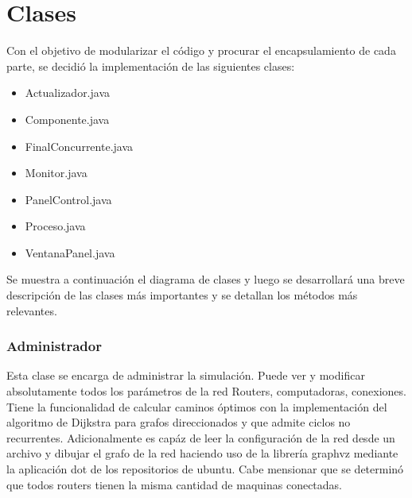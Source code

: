 \documentclass[12pt]{article} %
\begin{document}
\section{Clases}
Con el objetivo de modularizar el código y procurar el encapsulamiento de cada parte, se decidió la implementación de las siguientes clases:
\begin{itemize}
\item Actualizador.java
\item Componente.java
\item FinalConcurrente.java
\item Monitor.java
\item PanelControl.java
\item Proceso.java
\item VentanaPanel.java
\end{itemize}
Se muestra a continuación el diagrama de clases y luego se desarrollará una breve descripción de las clases más importantes y se detallan los métodos más relevantes.
\begin{figure}[H] %
\label{fig:DiagramaDeClases}
\end{figure}
\subsubsection{Administrador}
Esta clase se encarga de administrar la simulación. Puede ver y modificar absolutamente todos los parámetros de la red Routers, computadoras, conexiones. Tiene la funcionalidad de calcular caminos óptimos con la implementación del algoritmo de Dijkstra para grafos direccionados y que admite ciclos no recurrentes. Adicionalmente es capáz de leer la configuración de la red desde un archivo y dibujar el grafo de la red haciendo uso de la librería graphvz mediante la aplicación dot de los repositorios de ubuntu.
Cabe mensionar que se determinó que todos routers tienen la misma cantidad de maquinas conectadas.
\end{document}
